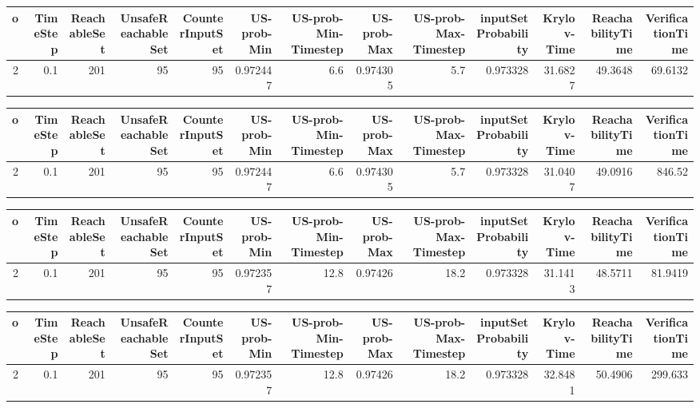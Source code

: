 \begin{tabular}{rrrrrrrrrrrrr}
\hline
   o &   TimeStep &   ReachableSet &   UnsafeReachableSet &   CounterInputSet &   US-prob-Min &   US-prob-Min-Timestep &   US-prob-Max &   US-prob-Max-Timestep &   inputSet Probability &   Krylov-Time &   ReachabilityTime &   VerificationTime \\
\hline
   2 &        0.1 &            201 &                   95 &                95 &      0.972447 &                    6.6 &      0.974305 &                    5.7 &               0.973328 &       31.6827 &            49.3648 &            69.6132 \\
\hline
\end{tabular}
\begin{tabular}{rrrrrrrrrrrrr}
\hline
   o &   TimeStep &   ReachableSet &   UnsafeReachableSet &   CounterInputSet &   US-prob-Min &   US-prob-Min-Timestep &   US-prob-Max &   US-prob-Max-Timestep &   inputSet Probability &   Krylov-Time &   ReachabilityTime &   VerificationTime \\
\hline
   2 &        0.1 &            201 &                   95 &                95 &      0.972447 &                    6.6 &      0.974305 &                    5.7 &               0.973328 &       31.0407 &            49.0916 &             846.52 \\
\hline
\end{tabular}
\begin{tabular}{rrrrrrrrrrrrr}
\hline
   o &   TimeStep &   ReachableSet &   UnsafeReachableSet &   CounterInputSet &   US-prob-Min &   US-prob-Min-Timestep &   US-prob-Max &   US-prob-Max-Timestep &   inputSet Probability &   Krylov-Time &   ReachabilityTime &   VerificationTime \\
\hline
   2 &        0.1 &            201 &                   95 &                95 &      0.972357 &                   12.8 &       0.97426 &                   18.2 &               0.973328 &       31.1413 &            48.5711 &            81.9419 \\
\hline
\end{tabular}
\begin{tabular}{rrrrrrrrrrrrr}
\hline
   o &   TimeStep &   ReachableSet &   UnsafeReachableSet &   CounterInputSet &   US-prob-Min &   US-prob-Min-Timestep &   US-prob-Max &   US-prob-Max-Timestep &   inputSet Probability &   Krylov-Time &   ReachabilityTime &   VerificationTime \\
\hline
   2 &        0.1 &            201 &                   95 &                95 &      0.972357 &                   12.8 &       0.97426 &                   18.2 &               0.973328 &       32.8481 &            50.4906 &            299.633 \\
\hline
\end{tabular}
